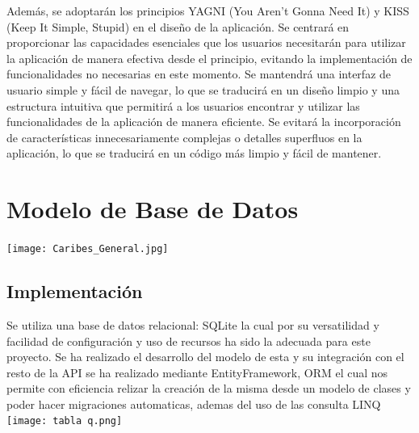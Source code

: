 \documentclass{article} %
\begin{document}
Además, se adoptarán los principios YAGNI (You Aren't Gonna Need It) y KISS (Keep It Simple, Stupid) en el diseño de la aplicación. Se centrará en proporcionar las capacidades esenciales que los usuarios necesitarán para utilizar la aplicación de manera efectiva desde el principio, evitando la implementación de funcionalidades no necesarias en este momento. Se mantendrá una interfaz de usuario simple y fácil de navegar, lo que se traducirá en un diseño limpio y una estructura intuitiva que permitirá a los usuarios encontrar y utilizar las funcionalidades de la aplicación de manera eficiente. Se evitará la incorporación de características innecesariamente complejas o detalles superfluos en la aplicación, lo que se traducirá en un código más limpio y fácil de mantener.


\section{Modelo de Base de Datos}
\texttt{[image: Caribes\_General.jpg]}
\subsection{Implementación}
Se utiliza una base de datos relacional: SQLite la cual por su versatilidad y  facilidad de configuración y uso de recursos ha sido la adecuada para este proyecto.
Se ha realizado el desarrollo del modelo de esta y su integración con el resto de la API se ha realizado mediante EntityFramework, ORM el cual nos permite con eficiencia relizar la creación de la misma desde un modelo de clases y poder hacer migraciones automaticas, ademas del uso de las consulta LINQ 
\newline
\texttt{[image: tabla q.png]}
\end{document}
